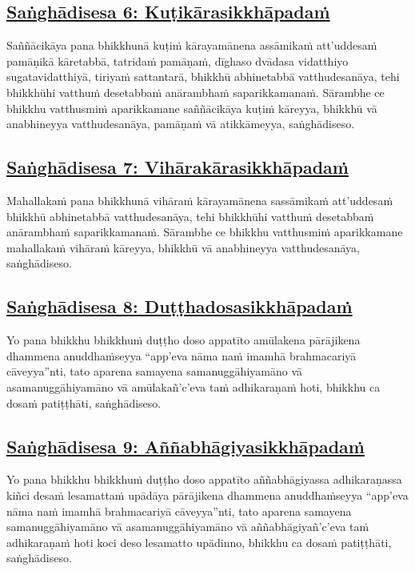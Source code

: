 \subsection*{\hyperref[comm6]{Saṅghādisesa 6: Kuṭikārasikkhāpadaṁ}}
\label{sd6}
Saññācikāya pana bhikkhunā kuṭiṁ kārayamānena assāmikaṁ att'uddesaṁ pamāṇikā kāretabbā, tatridaṁ pamāṇaṁ, dīghaso dvādasa vidatthiyo sugatavidatthiyā, tiriyaṁ sattantarā, bhikkhū abhinetabbā vatthudesanāya, tehi bhikkhūhi vatthuṁ desetabbaṁ anārambhaṁ saparikkamanaṁ. Sārambhe ce bhikkhu vatthusmiṁ aparikkamane saññācikāya kuṭiṁ kāreyya, bhikkhū vā anabhineyya vatthudesanāya, pamāṇaṁ vā atikkāmeyya, saṅghādiseso.

\subsection*{\hyperref[comm7]{Saṅghādisesa 7: Vihārakārasikkhāpadaṁ}}
\label{sd7}
Mahallakaṁ pana bhikkhunā vihāraṁ kārayamānena sassāmikaṁ att'uddesaṁ bhikkhū abhinetabbā vatthudesanāya, tehi bhikkhūhi vatthuṁ desetabbaṁ anārambhaṁ saparikkamanaṁ. Sārambhe ce bhikkhu vatthusmiṁ aparikkamane mahallakaṁ vihāraṁ kāreyya, bhikkhū vā anabhineyya vatthudesanāya, saṅghādiseso.

\subsection*{\hyperref[comm8]{Saṅghādisesa 8: Duṭṭhadosasikkhāpadaṁ}}
\label{sd8}
Yo pana bhikkhu bhikkhuṁ duṭṭho doso appatīto amūlakena pārājikena dhammena anuddhaṁseyya “app'eva nāma naṁ imamhā brahmacariyā cāveyya”nti, tato aparena samayena samanuggāhiyamāno vā asamanuggāhiyamāno vā amūlakañ'c'eva taṁ adhikaraṇaṁ hoti, bhikkhu ca dosaṁ patiṭṭhāti, saṅghādiseso.

\subsection*{\hyperref[comm9]{Saṅghādisesa 9: Aññabhāgiyasikkhāpadaṁ}}
\label{sd9}
Yo pana bhikkhu bhikkhuṁ duṭṭho doso appatīto aññabhāgiyassa adhikaraṇassa kiñci desaṁ lesamattaṁ upādāya pārājikena dhammena anuddhaṁseyya “app'eva nāma naṁ imamhā brahmacariyā cāveyya”nti, tato aparena samayena samanuggāhiyamāno vā asamanuggāhiyamāno vā aññabhāgiyañ'c'eva taṁ adhikaraṇaṁ hoti koci deso lesamatto upādinno, bhikkhu ca dosaṁ patiṭṭhāti, saṅghādiseso.

